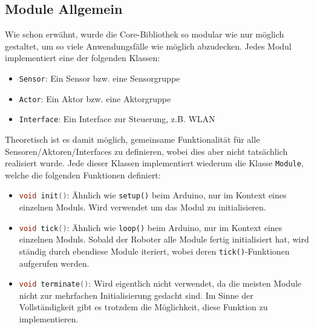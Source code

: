 \subsection{Module Allgemein}
\label{subsec:software_common_modules}
Wie schon erwähnt,
wurde die Core-Bibliothek so modular wie nur möglich gestaltet,
um so viele Anwendungsfälle wie möglich abzudecken.
%
Jedes Modul implementiert eine der folgenden Klassen:
\begin{itemize}
    \item \texttt{Sensor}: Ein Sensor bzw. eine Sensorgruppe
    \item \texttt{Actor}: Ein Aktor bzw. eine Aktorgruppe
    \item \texttt{Interface}: Ein Interface zur Steuerung, z.B. WLAN
\end{itemize}
Theoretisch ist es damit möglich,
gemeinsame Funktionalität für alle Sensoren/Aktoren/Interfaces zu definieren,
wobei dies aber nicht tatsächlich realisiert wurde.
%
Jede dieser Klassen implementiert wiederum die Klasse \texttt{Module},
welche die folgenden Funktionen definiert:
\begin{itemize}
    \item \lstinline[language=c]|void init()|:
        Ähnlich wie \texttt{setup()} beim Arduino, nur im Kontext eines einzelnen Moduls.
        Wird verwendet um das Modul zu initialisieren.
    \item \lstinline[language=c]|void tick()|:
        Ähnlich wie \texttt{loop()} beim Arduino, nur im Kontext eines einzelnen Moduls.
        Sobald der Roboter alle Module fertig initialisiert hat,
        wird ständig durch ebendiese Module iteriert,
        wobei deren \texttt{tick()}-Funktionen aufgerufen werden. 
    \item \lstinline[language=c]|void terminate()|:
        Wird eigentlich nicht verwendet,
        da die meisten Module nicht zur mehrfachen Initialisierung gedacht sind.
        Im Sinne der Vollständigkeit gibt es trotzdem die Möglichkeit,
        diese Funktion zu implementieren.
\end{itemize}


